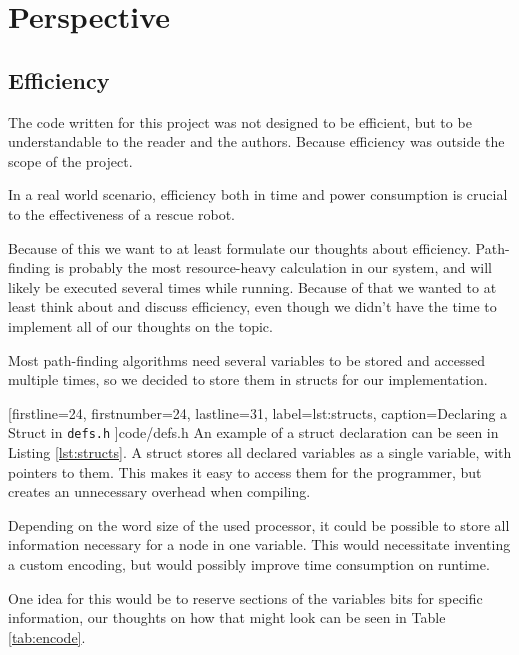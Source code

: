 \chapter{Perspective}
\section{Efficiency}
The code written for this project was not designed to be efficient,
but to be understandable to the reader and the authors.
Because efficiency was outside the scope of the project.

In a real world scenario,
efficiency both in time and power consumption is crucial to the effectiveness of a rescue robot.

Because of this we want to at least formulate our thoughts about efficiency.
Path-finding is probably the most resource-heavy calculation in our system,
and will likely be executed several times while running.
Because of that we wanted to at least think about and discuss efficiency,
even though we didn't have the time to implement all of our thoughts on the topic.

Most path-finding algorithms need several variables to be stored and accessed multiple times,
so we decided to store them in structs for our implementation.


[firstline=24,				%
firstnumber=24,
lastline=31,
label=lst:structs,	%
caption={Declaring a Struct  in {\tt defs.h}}
]{code/defs.h}
%
An example of a struct declaration can be seen in Listing \ref{lst:structs}.
A struct stores all declared variables as a single variable,
with pointers to them.
This makes it easy to access them for the programmer,
but creates an unnecessary overhead when compiling.

Depending on the word size of the used processor,
it could be possible to store all information necessary for a node in one variable.
This would necessitate inventing a custom encoding,
but would possibly improve time consumption on runtime.

One idea for this would be to reserve sections of the variables bits for specific information,
our thoughts on how that might look can be seen in Table \ref{tab:encode}.

